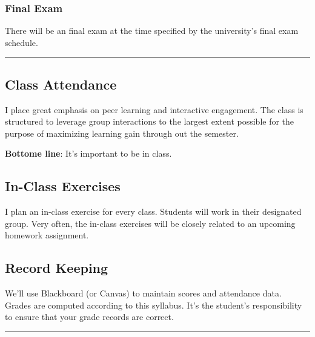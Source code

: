 \documentclass[11pt]{article}
\begin{document}
\subsubsection{Final Exam}\label{final-exam}

There will be an final exam at the time specified by the
university's final exam schedule.

\begin{center}\rule{0.5\linewidth}{0.5pt}\end{center}

\subsection{Class Attendance}\label{class-attendance}

I place great emphasis on peer learning and interactive engagement. The
class is structured to leverage group interactions to the largest extent
possible for the purpose of maximizing learning gain through out the
semester.

\textbf{Bottome line}: It's important to be in class.

\subsection{In-Class Exercises}\label{in-class-exercises}

I plan an in-class exercise for every class. Students will work in their
designated group. Very often, the in-class exercises will be closely
related to an upcoming homework assignment.

\subsection{Record Keeping}\label{record-keeping}

We'll use Blackboard (or Canvas) to maintain scores and
attendance data. Grades are computed according to this syllabus.
It's the student's responsibility to
ensure that your grade records are correct.

\begin{center}\rule{0.5\linewidth}{0.5pt}\end{center}


\end{document}
